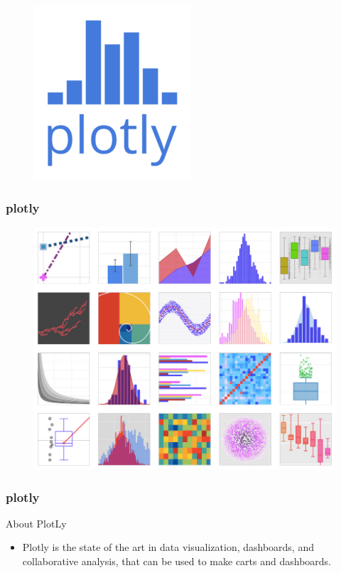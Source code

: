 \documentclass{beamer}
\begin{document}
	\begin{frame}
\begin{figure}
\centering
\includegraphics[width=0.7\linewidth]{plotlylogo}
\end{figure}
\end{frame}
\begin{frame}
\frametitle{plotly}
\large		
\begin{figure}
\centering
\includegraphics[width=0.7\linewidth]{plotlygallery}
\end{figure}

\end{frame}
\begin{frame}
\frametitle{plotly}
\Large	
About PlotLy
\begin{itemize}
	\item Plotly is the state of the art in data visualization, dashboards, and collaborative analysis, that can be used to make carts and dashboards.
\end{itemize}
\end{frame}
\end{document}
